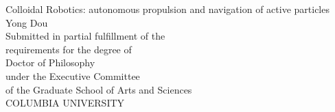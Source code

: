 
\begin{titlepage}
\begin{center}

\begin{singlespacing}
\vspace*{6\baselineskip}
Colloidal Robotics: autonomous propulsion and navigation of active particles\\
\vspace{3\baselineskip}
Yong Dou\\
\vspace{18\baselineskip}
Submitted in partial fulfillment of the\\
requirements for the degree of\\
Doctor of Philosophy\\
under the Executive Committee\\
of the Graduate School of Arts and Sciences\\
\vspace{3\baselineskip}
COLUMBIA UNIVERSITY\\
\vspace{3\baselineskip}
\the\year
\vfill


\end{singlespacing}

\end{center}
\end{titlepage}


